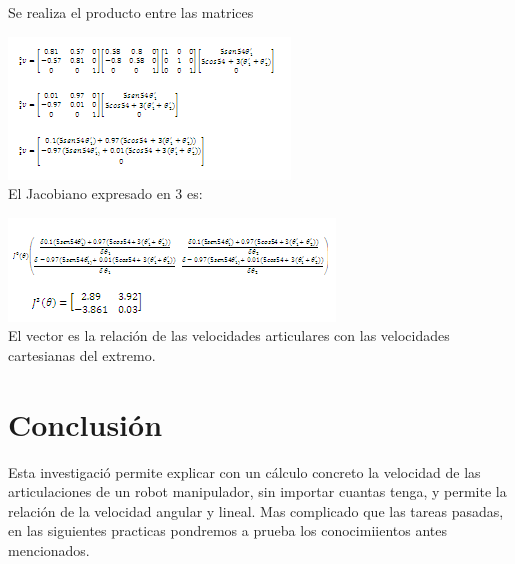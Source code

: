 \documentclass[12pt,a4paper]{report}
\begin{document}
  Se realiza el producto entre las matrices
  
  \hspace{4cm} \includegraphics{ecuacion12.png}\\
  
  El Jacobiano expresado en 3 es:
  

  
  \hspace{4cm} \includegraphics{ecuacion13.png}\\
  
  El vector es la relación de las velocidades articulares con las velocidades cartesianas del extremo.
  
  \section{Conclusión}
  Esta investigació permite explicar con un cálculo concreto la velocidad de las articulaciones de un robot   manipulador, sin importar cuantas tenga, y permite la relación de la velocidad angular y lineal.
  Mas complicado que las tareas pasadas, en las siguientes practicas pondremos a prueba los conocimiientos antes mencionados.
  
\cite{ollero}

  
\end{document}
